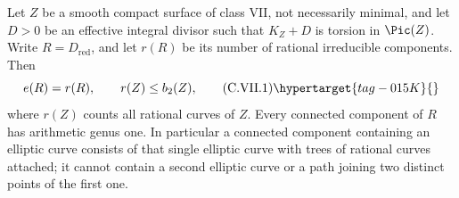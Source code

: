 \begin{proposition}\hypertarget{tag-01F0}{}\label{cdp:st:C.2.VII.1}



Let $Z$ be a smooth compact surface of class VII, not
necessarily minimal, and let $D>0$ be an effective integral
divisor such that $K_Z+D$ is torsion in $\Pic(Z)$.
Write $R=D_{\mathrm{red}}$, and let $r(R)$ be its number
of rational irreducible components. Then
\[
 e(R)=r(R),\qquad r(Z)\le b_2(Z),
\tag{C.VII.1}\hypertarget{tag-015K}{}\label{cdp:eq:C.VII.1}
\]
where $r(Z)$ counts all rational curves of $Z$.
Every connected component of $R$ has arithmetic genus one.
In particular a connected component containing an elliptic
curve consists of that single elliptic curve with trees of
rational curves attached; it cannot contain a second
elliptic curve or a path joining two distinct points of the
first one.
\end{proposition}

